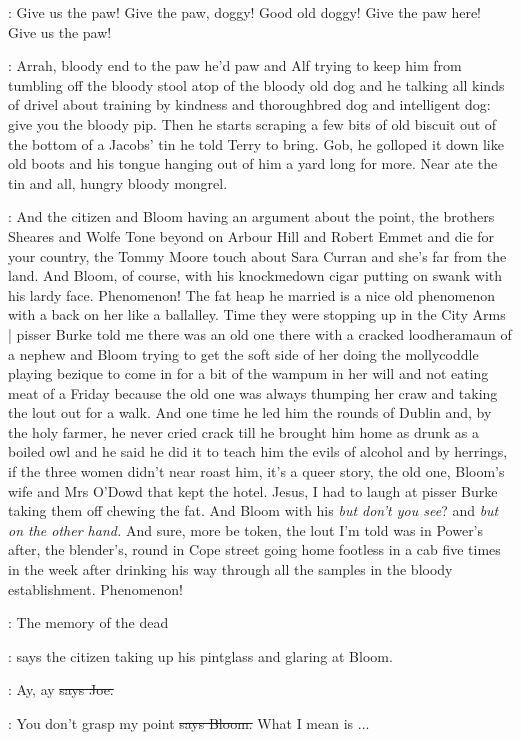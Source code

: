 \doran:
Give us the paw!
Give the paw,
doggy!
Good old doggy!
Give the paw
here!
Give us the paw!

\Nq:
Arrah,
bloody end to the paw he'd paw and Alf trying to keep him
from tumbling off the bloody stool atop of the bloody old dog and he
talking all kinds of drivel about training by kindness and thoroughbred
dog and intelligent dog:
give you the bloody pip.
Then he starts scraping
a few bits of old biscuit out of the bottom of a Jacobs' tin he told Terry
to bring.
Gob,
he golloped it down like old boots and his tongue hanging
out of him a yard long for more.
Near ate the tin and all,
hungry bloody
mongrel.

\Nq:
And the citizen and Bloom having an argument about the point,
the
brothers Sheares and Wolfe Tone beyond on Arbour Hill and Robert
Emmet and die for your country,
the Tommy Moore touch about Sara
Curran and she's far from the land.
And Bloom,
of course,
with his
knockmedown cigar putting on swank with his lardy face.
Phenomenon!
The fat heap he married is a nice old phenomenon with a back on her like a
ballalley.
Time they were stopping up in the City Arms |
pisser Burke told
me there was an old one there with a cracked loodheramaun of a nephew and
Bloom trying to get the soft side of her doing the mollycoddle playing
bezique to come in for a bit of the wampum in her will and not eating meat
of a Friday because the old one was always thumping her craw and taking
the lout out for a walk.
And one time he led him the rounds of Dublin and,
by the holy farmer,
he never cried crack till he brought him home as drunk
as a boiled owl and he said he did it to teach him the evils of alcohol
and by herrings,
if the three women didn't near roast him,
it's a queer
story,
the old one,
Bloom's wife and Mrs O'Dowd that kept the hotel.
Jesus,
I had to laugh at pisser Burke taking them off chewing the fat.
And Bloom with his \emph{but don't you see}?
and
\emph{but on the other hand.}
And sure,
more be token,
the lout I'm told was in Power's after,
the blender's,
round in Cope street going home footless in a cab five times in the week
after drinking his way through all the samples in the bloody
establishment.
Phenomenon!

\citizen:
The memory of the dead

\Nq:
says the citizen taking up his pintglass and
glaring at Bloom.%

\joe:
Ay,
ay
\sout{says Joe.}

\Bloom:
You don't grasp my point
\sout{says Bloom.}
What I mean is ...

